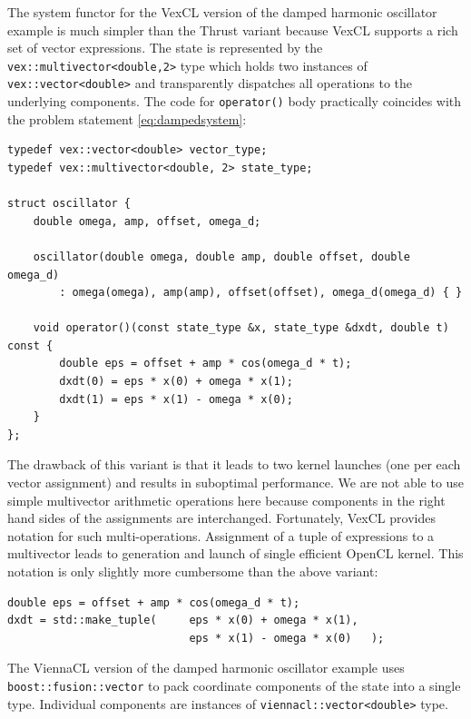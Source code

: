 \documentclass[1p]{elsarticle}
\newcommand{\code}[1]{\lstinline|#1|}
\begin{document}
The system functor for the VexCL version of the damped harmonic oscillator
example is much simpler than the Thrust variant because VexCL supports a rich
set of vector expressions. The state is represented by the
\code{vex::multivector<double,2>} type which holds two instances of
\code{vex::vector<double>} and transparently dispatches all operations to the
underlying components. The code for \code{operator()} body practically
coincides with the problem statement \eqref{eq:dampedsystem}:
\begin{lstlisting}
typedef vex::vector<double> vector_type;
typedef vex::multivector<double, 2> state_type;

struct oscillator {
    double omega, amp, offset, omega_d;

    oscillator(double omega, double amp, double offset, double omega_d)
        : omega(omega), amp(amp), offset(offset), omega_d(omega_d) { }

    void operator()(const state_type &x, state_type &dxdt, double t) const {
        double eps = offset + amp * cos(omega_d * t);
        dxdt(0) = eps * x(0) + omega * x(1);
        dxdt(1) = eps * x(1) - omega * x(0);
    }
};
\end{lstlisting}


The drawback of this variant is that it leads
to two kernel launches (one per each vector assignment) and results in
suboptimal performance. We are not able to use simple multivector arithmetic
operations here because components in the right hand sides of the assignments
are interchanged.  Fortunately, VexCL provides notation for such
multi-operations.  Assignment of a tuple of expressions to a multivector leads
to generation and launch of single efficient OpenCL kernel. This notation is
only slightly more cumbersome than the above variant:
\begin{lstlisting}[firstnumber=11]
double eps = offset + amp * cos(omega_d * t);
dxdt = std::make_tuple(     eps * x(0) + omega * x(1),
                            eps * x(1) - omega * x(0)   );
\end{lstlisting}

The ViennaCL version of the damped harmonic oscillator example uses
\code{boost::fusion::vector} to pack coordinate components of the state into a
single type. Individual components are instances of
\code{viennacl::vector<double>} type.
\end{document}

